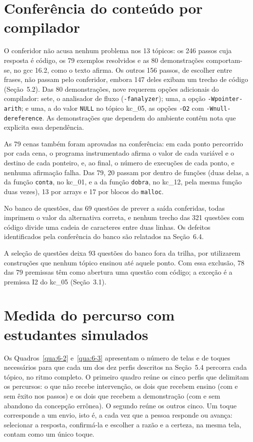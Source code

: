 \section{Conferência do conteúdo por compilador}

O conferidor não acusa nenhum problema nos 13 tópicos: os 246 passos cuja resposta é código, os 79 exemplos resolvidos e as 80 demonstrações comportam-se, no gcc 16.2, como o texto afirma. Os outros 156 passos, de escolher entre frases, não passam pelo conferidor, embora 147 deles exibam um trecho de código (Seção~5.2). Das 80 demonstrações, nove requerem opções adicionais do compilador: sete, o analisador de fluxo (\texttt{-{}fanalyzer}); uma, a opção \texttt{-{}Wpointer-{}arith}; e uma, a do valor \texttt{NULL} no tópico kc\_05, as opções \texttt{-{}O2} com \texttt{-{}Wnull-{}dereference}. As demonstrações que dependem do ambiente contêm nota que explicita essa dependência.

As 79 cenas também foram aprovadas na conferência: em cada ponto percorrido por cada cena, o programa instrumentado afirma o valor de cada variável e o destino de cada ponteiro, e, ao final, o número de execuções de cada ponto, e nenhuma afirmação falha. Das 79, 20 passam por dentro de funções (duas delas, a da função \texttt{conta}, no kc\_01, e a da função \texttt{dobra}, no kc\_12, pela mesma função duas vezes), 13 por arrays e 17 por blocos do \texttt{malloc}.

No banco de questões, das 69 questões de prever a saída conferidas, todas imprimem o valor da alternativa correta, e nenhum trecho das 321 questões com código divide uma cadeia de caracteres entre duas linhas. Os defeitos identificados pela conferência do banco são relatados na Seção~6.4.

A seleção de questões deixa 93 questões do banco fora da trilha, por utilizarem construções que nenhum tópico ensinou até aquele ponto. Com essa exclusão, 78 das 79 premissas têm como abertura uma questão com código; a exceção é a premissa I2 do kc\_05 (Seção~3.1).

\section{Medida do percurso com estudantes simulados}

Os Quadros~\ref{qua:6-2} e~\ref{qua:6-3} apresentam o número de telas e de toques necessários para que cada um dos dez perfis descritos na Seção~5.4 percorra cada tópico, no ritmo completo. O primeiro quadro reúne os cinco perfis que delimitam os percursos: o que não recebe intervenção, os dois que recebem ensino (com e sem êxito nos passos) e os dois que recebem a demonstração (com e sem abandono da concepção errônea). O segundo reúne os outros cinco. Um toque corresponde a um envio, isto é, a cada vez que a pessoa responde ou avança: selecionar a resposta, confirmá-la e escolher a razão e a certeza, na mesma tela, contam como um único toque.

